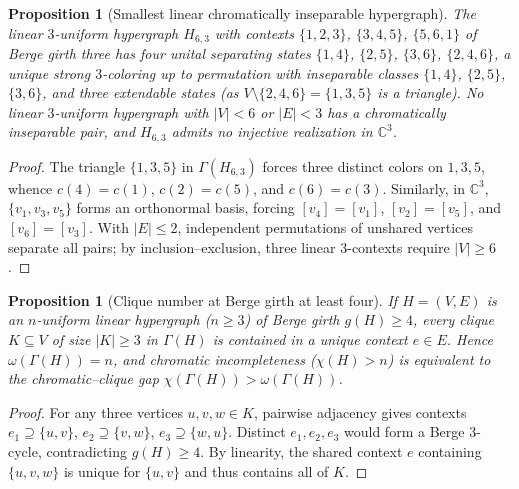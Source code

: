 \documentclass[aps,pra,reprint,superscriptaddress,longbibliography,nofootinbib,floatfix,10pt]{revtex4-2}
\newtheorem{proposition}[theorem]{Proposition}
\theoremstyle{definition}\newtheorem{definition}[theorem]{Definition}
\theoremstyle{remark}\newtheorem{remark}[theorem]{Remark}
\newcommand{\C}{\mathbb C}\newcommand{\R}{\mathbb R}\newcommand{\Q}{\mathbb Q}
\begin{document}
\begin{proposition}[Smallest linear chromatically inseparable hypergraph]\label{prop:six}
The linear $3$-uniform hypergraph $H_{6,3}$ with contexts $\{1,2,3\}$, $\{3,4,5\}$, $\{5,6,1\}$ of Berge girth three has four unital separating states $\{1,4\}$, $\{2,5\}$, $\{3,6\}$, $\{2,4,6\}$, a unique strong $3$-coloring up to permutation with inseparable classes $\{1,4\}$, $\{2,5\}$, $\{3,6\}$, and three extendable states (as $V\setminus\{2,4,6\}=\{1,3,5\}$ is a triangle). No linear $3$-uniform hypergraph with $|V|<6$ or $|E|<3$ has a chromatically inseparable pair, and $H_{6,3}$ admits no injective realization in $\C^3$.
\end{proposition}
\begin{proof}
The triangle $\{1,3,5\}$ in $\Gamma(H_{6,3})$ forces three distinct colors on $1,3,5$, whence $c(4)=c(1)$, $c(2)=c(5)$, and $c(6)=c(3)$. Similarly, in $\C^3$, $\{v_1,v_3,v_5\}$ forms an orthonormal basis, forcing $[v_4]=[v_1]$, $[v_2]=[v_5]$, and $[v_6]=[v_3]$. With $|E|\le2$, independent permutations of unshared vertices separate all pairs; by inclusion--exclusion, three linear $3$-contexts require $|V|\ge 6$.
\end{proof}

\begin{proposition}[Clique number at Berge girth at least four]\label{m:prop:ranks}
If $H=(V,E)$ is an $n$-uniform linear hypergraph ($n\ge3$) of Berge girth $g(H)\ge4$, every clique $K\subseteq V$ of size $|K|\ge3$ in $\Gamma(H)$ is contained in a unique context $e\in E$. Hence $\omega(\Gamma(H))=n$, and chromatic incompleteness ($\chi(H)>n$) is equivalent to the chromatic--clique gap $\chi(\Gamma(H))>\omega(\Gamma(H))$.
\end{proposition}
\begin{proof}
For any three vertices $u,v,w\in K$, pairwise adjacency gives contexts $e_1\supseteq\{u,v\}$, $e_2\supseteq\{v,w\}$, $e_3\supseteq\{w,u\}$. Distinct $e_1,e_2,e_3$ would form a Berge $3$-cycle, contradicting $g(H)\ge4$. By linearity, the shared context $e$ containing $\{u,v,w\}$ is unique for $\{u,v\}$ and thus contains all of $K$.
\end{proof}
\end{document}
